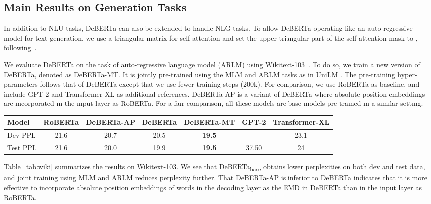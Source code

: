\documentclass{article}
\newcommand\ModelName{DeBERTa}
\begin{document}
\subsection{Main Results on Generation Tasks}
\label{subsec:generation}
In addition to NLU tasks, DeBERTa can also be extended to handle NLG tasks.
To allow DeBERTa operating like an auto-regressive model for text generation, we use a triangular matrix for self-attention and set the upper triangular part of the self-attention mask to , following~\cite{dong2019unilm}. 

We evaluate DeBERTa on the task of auto-regressive language model (ARLM) using Wikitext-103~\citep{merity2016pointer}. 
To do so, we train a new version of DeBERTa, denoted as DeBERTa-MT. 
It is jointly pre-trained using the MLM and ARLM tasks as in UniLM \citep{dong2019unilm}. 
The pre-training hyper-parameters follows that of DeBERTa except that we use fewer training steps (200k). For comparison, we use RoBERTa as baseline, and include GPT-2 and Transformer-XL as additional references.  
DeBERTa-AP is a variant of DeBERTa where absolute position embeddings are incorporated in the input layer as RoBERTa. 
For a fair comparison, all these models are base models pre-trained in a similar setting.


\begin{table*}[htb!]
    \centering
    \begin{tabular}{@{\hskip2pt}l|@{\hskip2pt} c @{\hskip2pt}|@{\hskip2pt} c @{\hskip2pt}| c@{\hskip2pt} |@{\hskip2pt}c@{\hskip2pt}|@{\hskip2pt} c@{\hskip2pt}|@{\hskip2pt}c @{\hskip2pt}}
        \toprule
        {\bf Model} &{RoBERTa}& {DeBERTa-AP} & {DeBERTa} & {DeBERTa-MT} &{GPT-2} &{Transformer-XL}  \\ 
        \midrule
        Dev PPL & 21.6 & 20.7 & 20.5 & \textbf{19.5} & -& 23.1  \\ \hline
        Test PPL & 21.6 & 20.0 & 19.9 & \textbf{19.5} &  37.50& 24  \\
        \bottomrule
        \end{tabular}
    \caption{
    Language model results in perplexity (lower is better) on Wikitext-103 . 
    }
    \label{tab:wiki}
\end{table*}
Table~\ref{tab:wiki} summarizes the results on Wikitext-103. 
We see that {\ModelName}\textsubscript{base} obtains lower perplexities on both dev and test data, and joint training using MLM and ARLM reduces perplexity further. That DeBERTa-AP is inferior to DeBERTa indicates that it is more effective to incorporate absolute position embeddings of words in the decoding layer as the EMD in DeBERTa than in the input layer as RoBERTa.
\end{document}
